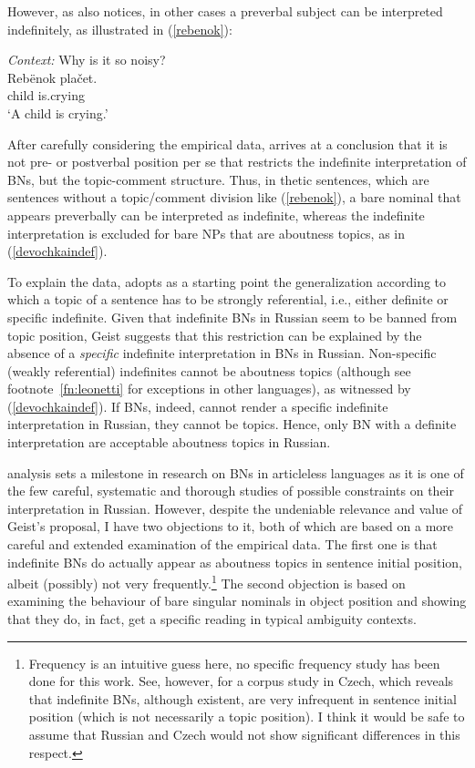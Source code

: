 \documentclass[output=paper,colorlinks,citecolor=brown]{langscibook}
\begin{document}
\noindent However, as \citet{geist10} also notices, in other cases a preverbal subject can be interpreted indefinitely, as illustrated in (\ref{rebenok}): 

\ea \textit{Context:} {Why is it} {so noisy?}\\
\gll Reb\"{e}nok pla\v{c}et. \label{rebenok}\\
child is.crying \\
\glt `A child is crying.' \hfill \citep[194, ex. (7)]{geist10}
\z

\noindent After carefully considering the empirical data, \citet{geist10} arrives at a conclusion that it is not pre- or postverbal position per se that restricts the indefinite interpretation of BNs, but the topic-comment structure. Thus, in thetic sentences, which are sentences without a topic/comment division like (\ref{rebenok}), a bare nominal that appears preverbally can be interpreted as indefinite, whereas the indefinite interpretation is excluded for bare NPs that are aboutness topics, as in (\ref{devochkaindef}). 

To explain the data, \citet{geist10} adopts as a starting point the generalization according to which a topic of a sentence has to be strongly referential, i.e., either definite or specific indefinite. Given that indefinite BNs in Russian seem to be banned from topic position, Geist suggests that this restriction can be explained by the absence of a \textit{specific} indefinite interpretation in BNs in Russian. Non-specific (weakly referential) indefinites cannot be aboutness topics (although see footnote~\ref{fn:leonetti} for exceptions in other languages), as witnessed by (\ref{devochkaindef}). If BNs, indeed, cannot render a specific indefinite interpretation in Russian, they cannot be topics. Hence, only BN with a definite interpretation are acceptable aboutness topics in Russian. 

 analysis sets a milestone in research on BNs in articleless languages as it is one of the few careful, systematic and thorough studies of possible constraints on their interpretation in Russian. However, despite the undeniable relevance and value of Geist's proposal, I have two objections to it, both of which are based on a more careful and extended examination of the empirical data. The first one is that indefinite BNs do actually appear as aboutness topics in sentence initial position, albeit (possibly) not very frequently.\footnote{Frequency is an intuitive guess here, no specific frequency study has been done for this work. See, however, \citet{simik-burianova20} for a corpus study in Czech, which reveals that indefinite BNs, although existent, are very infrequent in sentence initial position (which is not necessarily a topic position). I think it would be safe to assume that Russian and Czech would not show significant differences in this respect.} The second objection is based on examining the behaviour of bare singular nominals in object position and showing that they do, in fact, get a specific reading in typical ambiguity contexts. 
\end{document}
